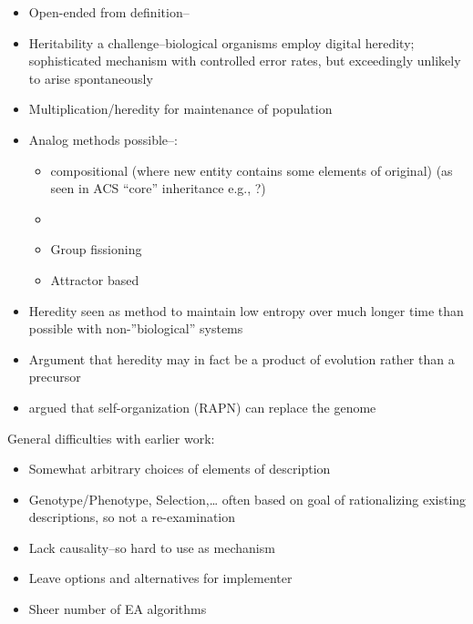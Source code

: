 \begin{itemize}
	\item
	      Open-ended from \autocite{MaynardSmith1999} definition--
	\item
	      Heritability a challenge--biological organisms employ digital
	      heredity; sophisticated mechanism with controlled error rates, but
	      exceedingly unlikely to arise spontaneously
	\item
	      Multiplication/heredity for maintenance of population
	\item
	      Analog methods possible--\eg:
	      	
	      \begin{itemize}
	      	\item
	      	      compositional (where new entity contains some elements of original)
	      	      (as seen in ACS ``core'' inheritance e.g., \autocite{Vasas2015, Watson2012}?)
	      	\item
	      	\item
	      	      Group fissioning \autocite{Watson2015}
	      	\item
	      	      Attractor based \autocite{Szathmary2000}
	      \end{itemize}
	\item
	      Heredity seen as method to maintain low entropy over much longer time
	      than possible with non-''biological'' systems \autocite{Adami2015}
	\item
	      Argument that heredity may in fact be a product of evolution rather than a precursor \autocite{Bourrat2015}
	\item
	      \autocite{Kauffman:1993kk} argued that self-organization (RAPN) can replace the genome
\end{itemize}

General difficulties with earlier work:
\begin{itemize}
	\item Somewhat arbitrary choices of elements of description
	\item Genotype/Phenotype, Selection,\ldots{} often based on goal of rationalizing existing descriptions, so not a re-examination
	\item Lack causality--so hard to use as mechanism
	\item Leave options and alternatives for implementer
	\item Sheer number of EA algorithms
\end{itemize}

